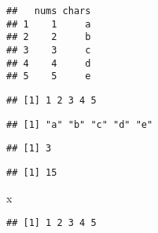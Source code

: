 \documentclass[
]{article}
\newenvironment{Shaded}{\begin{snugshade}}{\end{snugshade}}
\newcommand{\FunctionTok}[1]{\textcolor[rgb]{0.00,0.00,0.00}{#1}}
\newcommand{\NormalTok}[1]{#1}
\newcommand{\SpecialCharTok}[1]{\textcolor[rgb]{0.00,0.00,0.00}{#1}}
\begin{document}
\begin{verbatim}
##   nums chars
## 1    1     a
## 2    2     b
## 3    3     c
## 4    4     d
## 5    5     e
\end{verbatim}

\begin{Shaded}
\end{Shaded}

\begin{verbatim}
## [1] 1 2 3 4 5
\end{verbatim}

\begin{Shaded}
\end{Shaded}

\begin{verbatim}
## [1] "a" "b" "c" "d" "e"
\end{verbatim}

\begin{Shaded}
\end{Shaded}

\begin{verbatim}
## [1] 3
\end{verbatim}

\begin{Shaded}
\end{Shaded}

\begin{verbatim}
## [1] 15
\end{verbatim}

\begin{Shaded}
\begin{Highlighting}[]
\NormalTok{x}
\end{Highlighting}
\end{Shaded}

\begin{verbatim}
## [1] 1 2 3 4 5
\end{verbatim}
\end{document}
